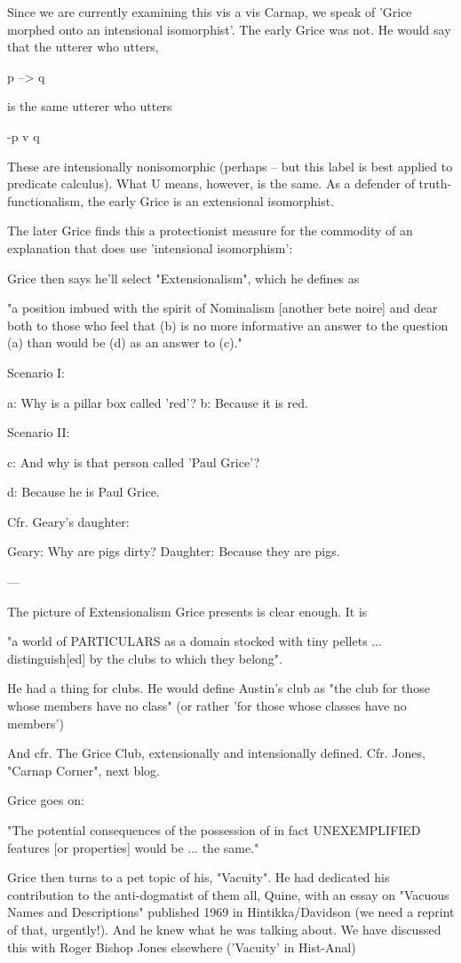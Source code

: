\documentclass[10pt,titlepage]{book}
\begin{document}
Since we are currently examining this vis a vis Carnap, we speak
of 'Grice morphed onto an intensional isomorphist'. The early Grice was
not. He would say that the utterer who utters,

p --> q

is the same utterer who utters

-p v q

These are intensionally nonisomorphic (perhaps -- but this label is
best applied to predicate calculus). What U means, however, is the
same. As a defender of truth-functionalism, the early Grice is an
extensional isomorphist.

The later Grice finds this a protectionist measure for the commodity of
an explanation that does use 'intensional isomorphism':

Grice then says he'll select "Extensionalism", which he defines as

"a position imbued with the
spirit of Nominalism [another bete noire]
and dear both to those who feel that (b) is no more
informative an answer to the question (a)
than would be (d) as an answer to
(c)."

Scenario I:


a: Why is a pillar box called 'red'?
b: Because it is red.


Scenario II:


c: And why is that person called 'Paul Grice'?

d: Because he is Paul Grice.


Cfr. Geary's daughter:

Geary: Why are pigs dirty?
Daughter: Because they are pigs.

---

The picture of Extensionalism Grice presents is clear enough. It is

"a world of PARTICULARS
as a domain
stocked with tiny pellets ...
distinguish[ed] by the clubs to which they
belong".

He had a thing for clubs. He would define Austin's club as "the club
for those whose members have no class" (or rather 'for those whose
classes have no members')

And cfr. The Grice Club, extensionally and intensionally defined. Cfr.
Jones, "Carnap Corner", next blog.

Grice goes on:

"The potential consequences of the possession
of in fact UNEXEMPLIFIED features [or properties]
would be ... the same."

Grice then turns to a pet topic of his, "Vacuity". He had dedicated his
contribution to the anti-dogmatist of them all, Quine, with an essay
on "Vacuous Names and Descriptions" published 1969 in Hintikka/Davidson
(we need a reprint of that, urgently!). And he knew what he was talking
about. We have discussed this with Roger Bishop Jones elsewhere
('Vacuity' in Hist-Anal)
\end{document}
